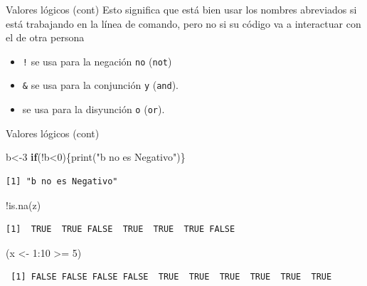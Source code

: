 \documentclass[
  ignorenonframetext,
  aspectratio=169,
  spanish,
]{beamer}
\newenvironment{Shaded}{\begin{snugshade}}{\end{snugshade}}
\newcommand{\ControlFlowTok}[1]{\textcolor[rgb]{0.00,0.23,0.31}{\textbf{#1}}}
\newcommand{\DecValTok}[1]{\textcolor[rgb]{0.68,0.00,0.00}{#1}}
\newcommand{\FunctionTok}[1]{\textcolor[rgb]{0.28,0.35,0.67}{#1}}
\newcommand{\NormalTok}[1]{\textcolor[rgb]{0.00,0.23,0.31}{#1}}
\newcommand{\OtherTok}[1]{\textcolor[rgb]{0.00,0.23,0.31}{#1}}
\newcommand{\SpecialCharTok}[1]{\textcolor[rgb]{0.37,0.37,0.37}{#1}}
\newcommand{\StringTok}[1]{\textcolor[rgb]{0.13,0.47,0.30}{#1}}
\providecommand{\tightlist}{%
  \setlength{\itemsep}{0pt}\setlength{\parskip}{0pt}}
\begin{document}
\begin{frame}[fragile]{Valores lógicos (cont)}
\label{valores-luxf3gicos-cont-1}
Esto significa que está bien usar los nombres abreviados si está
trabajando en la línea de comando, pero no si su código va a interactuar
con el de otra persona

\begin{itemize}
\tightlist
\item
  \texttt{!} se usa para la negación \texttt{no} (\texttt{not})\\
\item
  \texttt{\&} se usa para la conjunción \texttt{y} (\texttt{and}).
\item
  \texttt{\textbar{}} se usa para la disyunción \texttt{o}
  (\texttt{or}).
\end{itemize}
\end{frame}

\begin{frame}[fragile]{Valores lógicos (cont)}
\label{valores-luxf3gicos-cont-2}
\begin{Shaded}
\begin{Highlighting}[]
\NormalTok{b}\OtherTok{\textless{}{-}}\DecValTok{3}
\ControlFlowTok{if}\NormalTok{(}\SpecialCharTok{!}\NormalTok{b}\SpecialCharTok{\textless{}}\DecValTok{0}\NormalTok{)\{}\FunctionTok{print}\NormalTok{(}\StringTok{"b no es Negativo"}\NormalTok{)\}}
\end{Highlighting}
\end{Shaded}

\begin{verbatim}
[1] "b no es Negativo"
\end{verbatim}

\begin{Shaded}
\begin{Highlighting}[]
\SpecialCharTok{!}\FunctionTok{is.na}\NormalTok{(z) }
\end{Highlighting}
\end{Shaded}

\begin{verbatim}
[1]  TRUE  TRUE FALSE  TRUE  TRUE  TRUE FALSE
\end{verbatim}

\begin{Shaded}
\begin{Highlighting}[]
\NormalTok{(x }\OtherTok{\textless{}{-}} \DecValTok{1}\SpecialCharTok{:}\DecValTok{10} \SpecialCharTok{\textgreater{}=} \DecValTok{5}\NormalTok{) }
\end{Highlighting}
\end{Shaded}

\begin{verbatim}
 [1] FALSE FALSE FALSE FALSE  TRUE  TRUE  TRUE  TRUE  TRUE  TRUE
\end{verbatim}
\end{frame}
\end{document}
